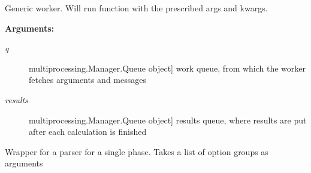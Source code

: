 \documentclass[letterpaper,10pt,english]{sphinxmanual}
\begin{document}
\begin{fulllineitems}
\begin{fulllineitems}
\begin{description}
\end{description}

\end{fulllineitems}


\begin{fulllineitems}
\label{index:encore.utils.ParallelCalculation.worker}
Generic worker. Will run function with the prescribed args and kwargs.

\textbf{Arguments:}
\begin{description}
\item[{\emph{q}}] \leavevmode{[}multiprocessing.Manager.Queue object{]}
work queue, from which the worker fetches arguments and messages

\item[{\emph{results}}] \leavevmode{[}multiprocessing.Manager.Queue object{]}
results queue, where results are put after each calculation is finished

\end{description}

\end{fulllineitems}


\end{fulllineitems}


\begin{fulllineitems}
\label{index:encore.utils.ParserPhase}
Wrapper for a parser for a single phase. Takes a list of option groups as arguments

\begin{fulllineitems}
\label{index:encore.utils.ParserPhase.add_option_groups}
\end{fulllineitems}


\begin{fulllineitems}
\label{index:encore.utils.ParserPhase.parse}
\end{fulllineitems}


\end{fulllineitems}
\end{document}
